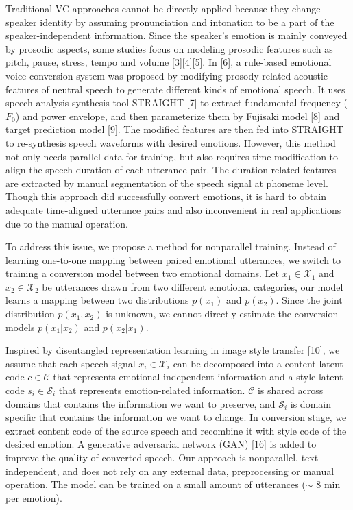 \documentclass{article}
\begin{document}
Traditional VC approaches cannot be directly applied because they change speaker identity by assuming pronunciation and intonation to be a part of the speaker-independent information. Since the speaker's emotion is mainly conveyed by prosodic aspects, some studies focus on modeling prosodic features such as pitch, pause, stress, tempo and volume  [3][4][5]. In [6], a rule-based emotional voice conversion system was proposed by modifying prosody-related acoustic features of neutral speech to generate different kinds of emotional speech. It uses speech analysis-synthesis tool STRAIGHT [7] to extract fundamental frequency ($F_0$) and power envelope, and then parameterize them by Fujisaki model [8] and target prediction model [9]. The modified features are then fed into STRAIGHT to re-synthesis speech waveforms with desired emotions. However, this method not only needs parallel data for training, but also requires time modification to align the speech duration of each utterance pair. The duration-related features are extracted by manual segmentation of the speech signal at phoneme level. Though this approach did successfully convert emotions, it is hard to obtain adequate time-aligned utterance pairs and also inconvenient in real applications due to the manual operation.

To address this issue, we propose a method for nonparallel training. Instead of learning one-to-one mapping between paired emotional utterances, we switch to training a conversion model between two emotional domains. Let $x_1 \in \mathcal{X}_1$ and $x_2 \in \mathcal{X}_2$ be utterances drawn from two different emotional categories, our model learns a mapping between two distributions $p(x_1)$ and $p(x_2)$. Since the joint distribution $p(x_1, x_2)$ is unknown, we cannot directly estimate the conversion models $p(x_1|x_2)$ and $p(x_2|x_1)$.

Inspired by disentangled representation learning in image style transfer [10], we assume that each speech signal $x_i \in \mathcal{X}_i$ can be decomposed into a content latent code $c \in \mathcal{C}$ that represents emotional-independent information and a style latent code $s_i \in \mathcal{S}_i$ that represents emotion-related information. $\mathcal{C}$ is shared across domains that contains the information we want to preserve, and $\mathcal{S}_i$ is domain specific that contains the information we want to change. In conversion stage, we extract content code of the source speech and recombine it with style code of the desired emotion. A generative adversarial network (GAN) [16] is added to improve the quality of converted speech. Our approach is nonparallel, text-independent, and does not rely on any external data, preprocessing or manual operation. The model can be trained on a small amount of utterances ($\sim$ 8 min per emotion).
\end{document}
